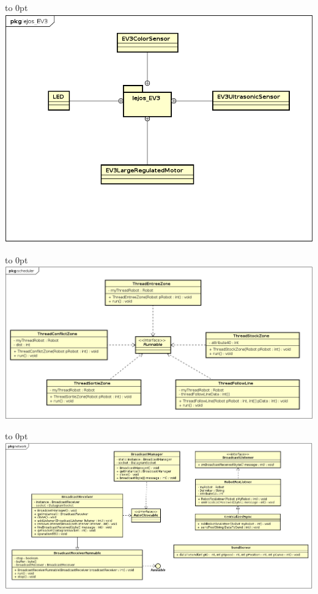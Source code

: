 \documentclass[french,a4paper,12pt]{report}
\begin{document}
\hfill\hbox to 0pt{\hss\includegraphics[width=15cm]{lejos_EV3.png}\hss}\hfill\null\newline

\hfill\hbox to 0pt{\hss\includegraphics[width=20cm]{scheduler.png}\hss}\hfill\null\newline

\hfill\hbox to 0pt{\hss\includegraphics[width=21cm]{network.png}\hss}\hfill\null\newline
\end{document}
